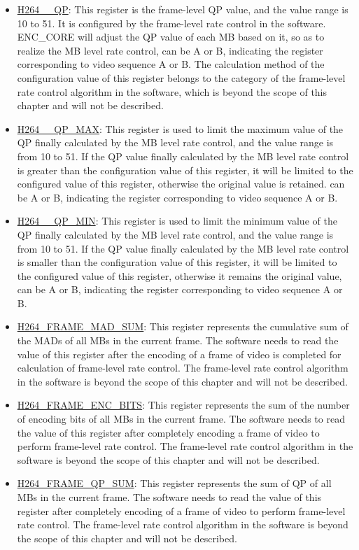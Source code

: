 \documentclass[main\_\_EN.tex]{subfiles}
\begin{document}
\begin{itemize}
    \item \hyperref[fielddesc:H264AQP]{H264\_\_QP}: This register is the frame-level QP value, and the value range is 10 to 51. It is configured by the frame-level rate control in the software. ENC\_CORE will adjust the QP value of each MB based on it, so as to realize the MB level rate control,  can be A or B, indicating the register corresponding to video sequence A or B. The calculation method of the configuration value of this register belongs to the category of the frame-level rate control algorithm in the software, which is beyond the scope of this chapter and will not be described.
    \item \hyperref[fielddesc:H264AQPMAX]{H264\_\_QP\_MAX}: This register is used to limit the maximum value of the QP finally calculated by the MB level rate control, and the value range is from 10 to 51. If the QP value finally calculated by the MB level rate control is greater than the configuration value of this register, it will be limited to the configured value of this register, otherwise the original value is retained.  can be A or B, indicating the register corresponding to video sequence A or B.
    \item \hyperref[fielddesc:H264AQPMIN]{H264\_\_QP\_MIN}: This register is used to limit the minimum value of the QP finally calculated by the MB level rate control, and the value range is from 10 to 51. If the QP value finally calculated by the MB level rate control is smaller than the configuration value of this register, it will be limited to the configured value of this register, otherwise it remains the original value,  can be A or B, indicating the register corresponding to video sequence A or B.
    \item \hyperref[fielddesc:H264FRAMEMADSUM]{H264\_FRAME\_MAD\_SUM}: This register represents the cumulative sum of the MADs of all MBs in the current frame. The software needs to read the value of this register after the encoding of a frame of video is completed for calculation of frame-level rate control. The frame-level rate control algorithm in the software is beyond the scope of this chapter and will not be described.
    \item \hyperref[fielddesc:H264FRAMEENCBITS]{H264\_FRAME\_ENC\_BITS}: This register represents the sum of the number of encoding bits of all MBs in the current frame. The software needs to read the value of this register after completely encoding a frame of video to perform frame-level rate control. The frame-level rate control algorithm in the software is beyond the scope of this chapter and will not be described.
    \item \hyperref[fielddesc:H264FRAMEQPSUM]{H264\_FRAME\_QP\_SUM}: This register represents the sum of QP of all MBs in the current frame. The software needs to read the value of this register after completely encoding of a frame of video to perform frame-level rate control. The frame-level rate control algorithm in the software is beyond the scope of this chapter and will not be described.
\end{itemize}
\end{document}
